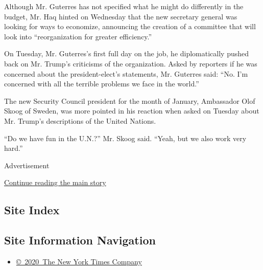 Although Mr. Guterres has not specified what he might do differently in
the budget, Mr. Haq hinted on Wednesday that the new secretary general
was looking for ways to economize, announcing the creation of a
committee that will look into ``reorganization for greater efficiency.''

On Tuesday, Mr. Guterres's first full day on the job, he diplomatically
pushed back on Mr. Trump's criticisms of the organization. Asked by
reporters if he was concerned about the president-elect's statements,
Mr. Guterres said: ``No. I'm concerned with all the terrible problems we
face in the world.''

The new Security Council president for the month of January, Ambassador
Olof Skoog of Sweden, was more pointed in his reaction when asked on
Tuesday about Mr. Trump's descriptions of the United Nations.

``Do we have fun in the U.N.?'' Mr. Skoog said. ``Yeah, but we also work
very hard.''

Advertisement

\protect\hyperlink{after-bottom}{Continue reading the main story}

\hypertarget{site-index}{%
\subsection{Site Index}\label{site-index}}

\hypertarget{site-information-navigation}{%
\subsection{Site Information
Navigation}\label{site-information-navigation}}

\begin{itemize}
\tightlist
\item
  \href{https://help.nytimes.com/hc/en-us/articles/115014792127-Copyright-notice}{©~2020~The
  New York Times Company}
\end{itemize}

